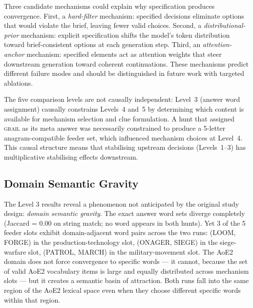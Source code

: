 Three candidate mechanisms could explain why specification produces convergence. First, a \emph{hard-filter} mechanism: specified decisions eliminate options that would violate the brief, leaving fewer valid choices. Second, a \emph{distributional-prior} mechanism: explicit specification shifts the model's token distribution toward brief-consistent options at each generation step. Third, an \emph{attention-anchor} mechanism: specified elements act as attention weights that steer downstream generation toward coherent continuations. These mechanisms predict different failure modes and should be distinguished in future work with targeted ablations.

The five comparison levels are not causally independent: Level~3 (answer word assignment) causally constrains Levels~4 and~5 by determining which content is available for mechanism selection and clue formulation. A hunt that assigned \textsc{grail} as its meta answer was necessarily constrained to produce a 5-letter anagram-compatible feeder set, which influenced mechanism choices at Level~4. This causal structure means that stabilising upstream decisions (Levels~1--3) has multiplicative stabilising effects downstream.

\subsection{Domain Semantic Gravity}

The Level 3 results reveal a phenomenon not anticipated by the original study design: \textit{domain semantic gravity}. The exact answer word sets diverge completely (Jaccard = 0.00 on string match; no word appears in both hunts). Yet 3 of the 5 feeder slots exhibit domain-adjacent word pairs across the two runs: (LOOM, FORGE) in the production-technology slot, (ONAGER, SIEGE) in the siege-warfare slot, (PATROL, MARCH) in the military-movement slot. The AoE2 domain does not force convergence to specific words --- it cannot, because the set of valid AoE2 vocabulary items is large and equally distributed across mechanism slots --- but it creates a semantic basin of attraction. Both runs fall into the same region of the AoE2 lexical space even when they choose different specific words within that region.

